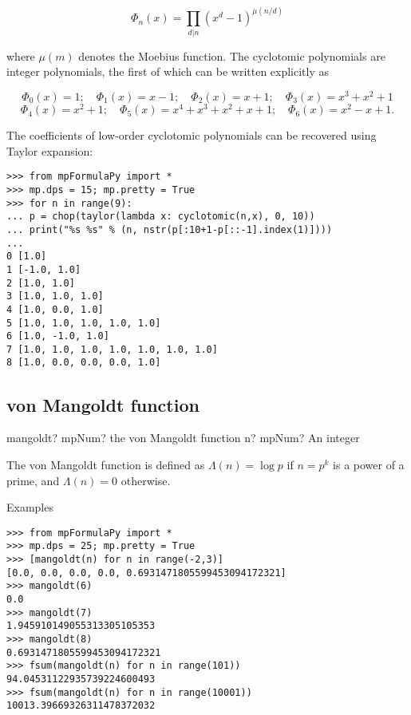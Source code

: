\begin{equation}
\Phi_n(x) = \prod_{d|n}(x^d - 1)^{\mu(n/d)}
\end{equation}

where $\mu(m)$ denotes the Moebius function. The cyclotomic polynomials are integer polynomials, the first of which can be written explicitly as

\begin{equation}
\Phi_0(x) = 1; \quad \Phi_1(x) = x-1; \quad \Phi_2(x) = x+1; \quad \Phi_3(x) = x^3+x^2+1
\end{equation}
\begin{equation}
\Phi_4(x) = x^2+1; \quad \Phi_5(x) = x^4+x^3+x^2+x+1; \quad \Phi_6(x) = x^2-x+1.
\end{equation}

The coefficients of low-order cyclotomic polynomials can be recovered using Taylor expansion:

\begin{lstlisting}
>>> from mpFormulaPy import *
>>> mp.dps = 15; mp.pretty = True
>>> for n in range(9):
... p = chop(taylor(lambda x: cyclotomic(n,x), 0, 10))
... print("%s %s" % (n, nstr(p[:10+1-p[::-1].index(1)])))
...
0 [1.0]
1 [-1.0, 1.0]
2 [1.0, 1.0]
3 [1.0, 1.0, 1.0]
4 [1.0, 0.0, 1.0]
5 [1.0, 1.0, 1.0, 1.0, 1.0]
6 [1.0, -1.0, 1.0]
7 [1.0, 1.0, 1.0, 1.0, 1.0, 1.0, 1.0]
8 [1.0, 0.0, 0.0, 0.0, 1.0]
\end{lstlisting}



\newpage
\subsection{von Mangoldt function}


\begin{mpFunctionsExtract}
	\mpFunctionOne
	{mangoldt? mpNum? the von Mangoldt function}
	{n? mpNum? An integer}	
\end{mpFunctionsExtract}


The von Mangoldt function is defined as $\Lambda(n)=\log p$ if $n=p^k$ is a power of a prime, and $\Lambda(n)=0$ otherwise.

Examples

\begin{lstlisting}
>>> from mpFormulaPy import *
>>> mp.dps = 25; mp.pretty = True
>>> [mangoldt(n) for n in range(-2,3)]
[0.0, 0.0, 0.0, 0.0, 0.6931471805599453094172321]
>>> mangoldt(6)
0.0
>>> mangoldt(7)
1.945910149055313305105353
>>> mangoldt(8)
0.6931471805599453094172321
>>> fsum(mangoldt(n) for n in range(101))
94.04531122935739224600493
>>> fsum(mangoldt(n) for n in range(10001))
10013.39669326311478372032
\end{lstlisting}





